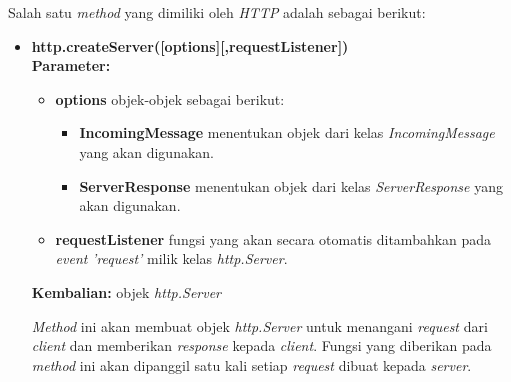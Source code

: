 Salah satu \textit{method} yang dimiliki oleh \textit{HTTP} adalah sebagai berikut:
\begin{itemize}
	\item \textbf{http.createServer([options][,requestListener])} \\ 
	\textbf{Parameter:}
	\begin{itemize}
		\item \textbf{options} objek-objek sebagai berikut:
			\begin{itemize}
				\item \textbf{IncomingMessage} menentukan objek dari kelas \textit{IncomingMessage} yang akan digunakan.
				\item \textbf{ServerResponse} menentukan objek dari kelas \textit{ServerResponse} yang akan digunakan.
			\end{itemize}
			
		\item \textbf{requestListener} fungsi yang akan secara otomatis ditambahkan pada \textit{event} \textit{'request'} milik kelas \textit{http.Server}.
	\end{itemize}
	\textbf{Kembalian:} objek \textit{http.Server}
	
	\textit{Method} ini akan membuat objek \textit{http.Server} untuk menangani \textit{request} dari \textit{client} dan memberikan \textit{response} kepada \textit{client}. Fungsi yang diberikan pada \textit{method} ini akan dipanggil satu kali setiap \textit{request} dibuat kepada \textit{server}.
	

\end{itemize}
